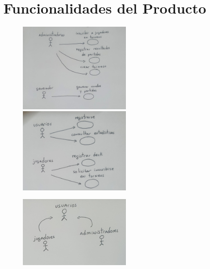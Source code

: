 \documentclass[a4paper]{article}
\begin{document}
\section{Funcionalidades del Producto}
	\begin{figure}[h]
  		\includegraphics[width=0.5\textwidth]{r2.jpg} 
  		\includegraphics[width=0.5\textwidth]{r3.jpg}  
	\end{figure}
	\begin{figure}[h]  
  		\centering
  		\includegraphics[width=0.5\textwidth]{r1.jpg}
	\end{figure}
\newpage
\end{document}
